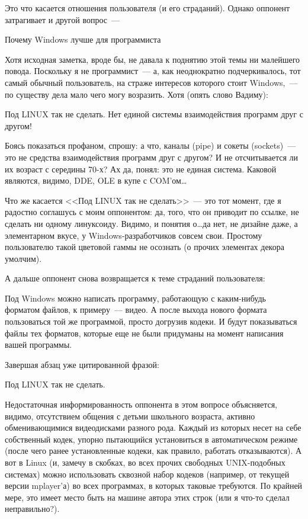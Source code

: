 Это что касается отношения пользователя (и его страданий). Однако оппонент затрагивает и другой вопрос~--- 


\begin{shadequote}{}
Почему Windows лучше для программиста  
\end{shadequote}

Хотя исходная заметка, вроде бы, не давала к поднятию этой темы ни малейшего повода. Поскольку я не программист~--- а, как неоднократно подчеркивалось, тот самый обычный пользователь, на страже интересов которого стоит Windows,~--- по существу дела мало чего могу возразить. Хотя (опять слово Вадиму):


\begin{shadequote}{}
Под LINUX так не сделать. Нет единой системы взаимодействия программ друг с другом!  
\end{shadequote}

Боясь показаться профаном, спрошу: а что, каналы (pipe) и сокеты (sockets)~--- это не средства взаимодействия программ друг с другом? И не отсчитывается ли их возраст с середины 70-х? Ах да, понял: это не единая система. Каковой являются, видимо, DDE, OLE в купе с COM'ом\dots

Что же касается <<Под LINUX так не сделать>>~--- это тот момент, где я радостно соглашусь с моим оппонентом: да, того, что он приводит по ссылке, не сделать ни одному линуксоиду. Видимо, и понятия о\dots да нет, не дизайне даже, а элементарном вкусе, у Windows-разработчиков совсем свои. Простому пользователю такой цветовой гаммы не осознать (о прочих элементах декора умолчим).

А дальше оппонент снова возвращается к теме страданий пользователя:


\begin{shadequote}{}
Под Windows можно написать программу, работающую с каким-нибудь форматом файлов, к примеру~--- видео. А после выхода нового формата пользоваться той же программой, просто догрузив кодеки. И будут показываться файлы тех форматов, которые еще не были придуманы на момент написания вашей программы.  
\end{shadequote}

Завершая абзац уже цитированной фразой:


\begin{shadequote}{}
Под LINUX так не сделать.
\end{shadequote}

Недостаточная информированность оппонента в этом вопросе объясняется, видимо, отсутствием общения с детьми школьного возраста, активно обменивающимися видеодисками разного рода. Каждый из которых несет на себе собственный кодек, упорно пытающийся установиться в автоматическом режиме (после чего ранее установленные кодеки, как правило, работать отказываются). А вот в Linux (и, замечу в скобках, во всех прочих свободных UNIX-подобных системах) можно использовать сквозной набор кодеков (например, от текущей версии mplayer'а) во всех программах, в которых таковые требуются. По крайней мере, это имеет место быть на машине автора этих строк (или я что-то сделал неправильно?).

